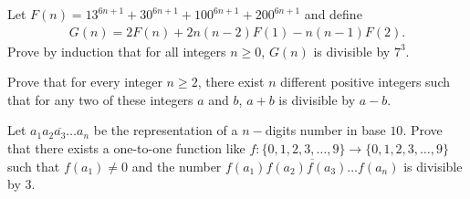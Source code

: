 \documentclass{subfile}
\begin{document}
	\begin{problem}
		Let $F(n) = 13^{6n+1} + 30^{6n+1} + 100^{6n+1} + 200^{6n+1}$ and define
			\begin{align*}
				G(n) = 2F(n) + 2n(n - 2)F(1) - n(n - 1)F(2).
			\end{align*}
		Prove by induction that for all integers $n \geq 0$, $G(n)$ is divisible by $7^3$. %
	\end{problem}

	\begin{problem}
		Prove that for every integer $n \geq 2$, there exist $n$ different positive integers such that for any two of these integers $a$ and $b$, $a+b$ is divisible by $a - b.$ %
	\end{problem}

%

	\begin{problem}
		Let $\overline{a_1a_2a_3\ldots a_n}$ be the representation of a $n-$digits number in base $10.$ Prove that there exists a one-to-one function like $f : \{0, 1, 2, 3, \ldots, 9\} \to \{0, 1, 2, 3, \ldots, 9\}$ such that $f(a_1) \neq 0$ and the number $\overline{ f(a_1)f(a_2)f(a_3) \ldots f(a_n) }$ is divisible by $3.$ %
	\end{problem}

\end{document}
